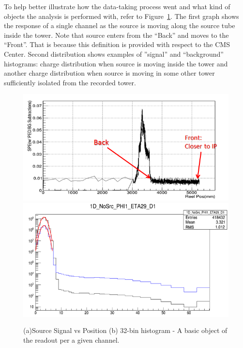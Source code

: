 To help better illustrate how the data-taking process went and what kind of objects the analysis is performed with, refer to Figure~\ref{fig:hf_campaigns_histograms}. The first graph shows the response of a single channel as the source is moving along the source tube inside the tower. Note that source enters from the ``Back'' and moves to the ``Front''. That is because this definition is provided with respect to the CMS Center. Second distribution shows examples of ''signal'' and ``background'' histograms: charge distribution when source is moving inside the tower and another charge distribution when source is moving in some other tower sufficiently isolated from the recorded tower.
\begin{figure}[htb]
    \begin{center}
        \includegraphics[width=.8\textwidth]{figures/ch_hfcalibration/Signal_ReelPos.png}
        \includegraphics[width=.8\textwidth]{figures/ch_hfcalibration/Signal_Histogram.png}
        \caption
        {(a)Source Signal vs Position (b) 32-bin histogram - A basic object of the readout per a given channel.}
        \label{fig:hf_campaigns_histograms}
    \end{center}
\end{figure}


